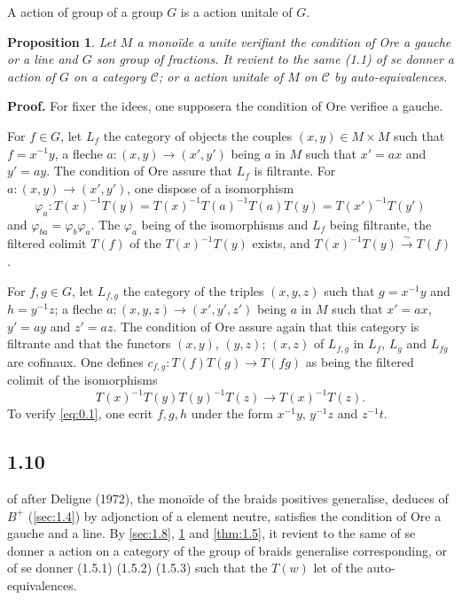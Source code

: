 \documentclass[11pt,a4paper]{article}
\theoremstyle{plain}
\newtheorem{proposition}[theorem]{Proposition}
\theoremstyle{definition}
\newcommand{\cC}{\mathscr{C}}
\begin{document}
A action of group of a group $G$ is a action unitale of $G$.

\begin{proposition}\label{prop:1.9}
Let $M$ a mono\"ide a unite verifiant the condition of Ore a gauche or a line and $G$ son group of fractions. It revient to the same \textup{(1.1)} of se donner a action of $G$ on a category $\cC$; or a action unitale of $M$ on $\cC$ by auto-equivalences.
\end{proposition}

\noindent\textbf{Proof.} For fixer the idees, one supposera the condition of Ore verifiee a gauche.

For $f \in G$, let $L_f$ the category of objects the couples $(x,y) \in M \times M$ such that $f = x^{-1}y$, a fleche $a : (x,y) \to (x',y')$ being $a$ in $M$ such that $x' = ax$ and $y' = ay$. The condition of Ore assure that $L_f$ is filtrante. For $a : (x,y) \to (x',y')$, one dispose of a isomorphism
\[
\varphi_a : T(x)^{-1} T(y) = T(x)^{-1} T(a)^{-1} T(a) T(y) = T(x')^{-1} T(y')
\]
and $\varphi_{ba} = \varphi_b \varphi_a$. The $\varphi_a$ being of the isomorphisms and $L_f$ being filtrante, the filtered colimit $T(f)$ of the $T(x)^{-1} T(y)$ exists, and $T(x)^{-1} T(y) \xrightarrow{\;\sim\;} T(f)$.

For $f, g \in G$, let $L_{f,g}$ the category of the triples $(x,y,z)$ such that $g = x^{-1}y$ and $h = y^{-1}z$; a fleche $a : (x,y,z) \to (x',y',z')$ being $a$ in $M$ such that $x' = ax$, $y' = ay$ and $z' = az$. The condition of Ore assure again that this category is filtrante and that the functors $(x,y)$, $(y,z)$; $(x,z)$ of $L_{f,g}$ in $L_f$, $L_g$ and $L_{fg}$ are cofinaux. One defines $c_{f,g} : T(f)T(g) \to T(fg)$ as being the filtered colimit of the isomorphisms
\[
T(x)^{-1} T(y) T(y)^{-1} T(z) \to T(x)^{-1} T(z).
\]
To verify \eqref{eq:0.1}, one ecrit $f, g, h$ under the form $x^{-1}y$, $y^{-1}z$ and $z^{-1}t$.

\subsection*{1.10}\label{sec:1.10}

of after Deligne (1972), the mono\"ide of the braids positives generalise, deduces of $B^+$ (\ref{sec:1.4}) by adjonction of a element neutre, satisfies the condition of Ore a gauche and a line. By \ref{sec:1.8}, \ref{prop:1.9} and \ref{thm:1.5}, it revient to the same of se donner a action on a category of the group of braids generalise corresponding, or of se donner (1.5.1) (1.5.2) (1.5.3) such that the $T(w)$ let of the auto-equivalences.
\end{document}
